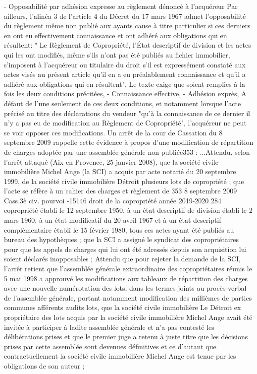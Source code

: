 		- Opposabilité par adhésion expresse au règlement dénoncé à l’acquéreur
		Par ailleurs, l'alinéa 3 de l'article 4 du Décret du 17 mars 1967 admet l'opposabilité du règlement même non publié aux ayants cause à titre particulier si ces derniers en ont eu effectivement connaissance et ont adhéré aux obligations qui en résultent:
		" Le Règlement de Copropriété, l'État descriptif de division et les actes qui les ont modifiés, même s'ils n'ont pas été publiés au fichier immobilier, s'imposent à l'acquéreur ou titulaire du droit s'il est expressément constaté aux actes visés au présent article qu'il en a eu préalablement connaissance et qu'il a adhéré aux obligations qui en résultent".
		Le texte exige que soient remplies à la fois les deux conditions précitées,
		- Connaissance effective,
		- Adhésion exprès,
		A défaut de l'une seulement de ces deux conditions, et notamment lorsque l'acte précisé au titre des déclarations du vendeur "qu'à la connaissance de ce dernier il n'y a pas eu de modification au Règlement de Copropriété", l'acquéreur ne peut se voir opposer ces modifications.
		Un arrêt de la cour de Cassation du 8 septembre 2009 rappelle cette évidence à propos d’une modification de répartition de charges adoptée par une assemblée générale non publiée353 :
		...Attendu, selon l'arrêt attaqué (Aix en Provence, 25 janvier 2008), que la société civile immobilière Michel Ange (la SCI) a acquis par acte notarié du 20 septembre 1999, de la société civile immobilière Détroit plusieurs lots de copropriété ; que l'acte se réfère à un cahier des charges et règlement de
		353 8 septembre 2009 Cass.3è civ. pourvoi -15146
		droit de la copropriété année 2019-2020
		284
		copropriété établi le 12 septembre 1950, à un état descriptif de division établi le 2 mars 1960, à un état modificatif du 20 avril 1967 et à un état descriptif complémentaire établi le 15 février 1980, tous ces actes ayant été publiés au bureau des hypothèques ; que la SCI a assigné le syndicat des copropriétaires pour que les appels de charges qui lui ont été adressés depuis son acquisition lui soient déclarés inopposables ;
		Attendu que pour rejeter la demande de la SCI, l'arrêt retient que l'assemblée générale extraordinaire des copropriétaires réunis le 5 mai 1998 a approuvé les modifications aux tableaux de répartition des charges avec une nouvelle numérotation des lots, dans les termes joints au procès-verbal de l'assemblée générale, portant notamment modification des millièmes de parties communes afférents audits lots, que la société civile immobilière
		Le Détroit ex propriétaire des lots acquis par la société civile immobilière Michel Ange avait été invitée à participer à ladite assemblée générale et n'a pas contesté les délibérations prises et que le premier juge a retenu à juste titre que les décisions prises par cette assemblée sont devenues définitives et ce d'autant que contractuellement la société civile immobilière Michel Ange est tenue par les obligations de son auteur ;
